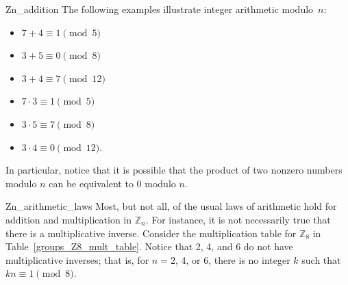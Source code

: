 \begin{example}{Zn_addition}
The following examples illustrate integer arithmetic modulo~$n$:
\begin{multicols}{2}
\begin{itemize}

\item[]
$7 + 4  \equiv  1 \pmod{ 5}$ 

\item[]
$3 + 5 \equiv  0 \pmod{ 8}$ 

\item[]
$3 + 4  \equiv  7 \pmod{ 12}$

\item[]
$7 \cdot 3 \equiv 1 \pmod{ 5}$ 

\item[]
$3 \cdot 5  \equiv  7 \pmod{ 8}$

\item[]
$3 \cdot 4  \equiv  0 \pmod{ 12}$.

\end{itemize}
\end{multicols}
In particular, notice that it is possible that the product of two nonzero numbers modulo $n$ can be equivalent to $0 $ modulo $n$. 
\end{example}

\begin{example}{Zn_arithmetic_laws}
Most, but not all, of the usual laws of arithmetic hold for addition and multiplication in ${\mathbb Z}_n$.  For instance, it is not necessarily true that there is a multiplicative inverse.  Consider the multiplication table for ${\mathbb Z}_8$ in Table~\ref{groups_Z8_mult_table}.  Notice that 2, 4, and 6 do not have multiplicative inverses; that is, for $n = 2$, 4, or 6, there is no integer $k$ such that $k n \equiv 1 \pmod{ 8}$.
\mbox{\hspace*{1in}}
\end{example}



